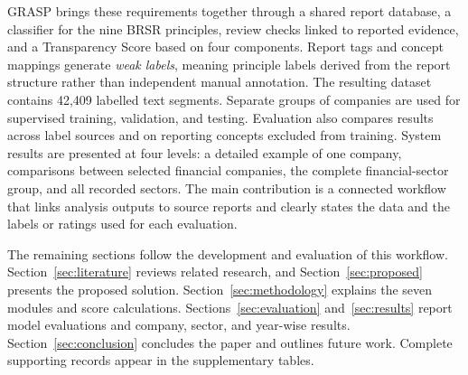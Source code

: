 GRASP brings these requirements together through a shared report database, a classifier for the nine BRSR principles, review checks linked to reported evidence, and a Transparency Score based on four components. Report tags and concept mappings generate \emph{weak labels}, meaning principle labels derived from the report structure rather than independent manual annotation. The resulting dataset contains 42,409 labelled text segments. Separate groups of companies are used for supervised training, validation, and testing. Evaluation also compares results across label sources and on reporting concepts excluded from training. System results are presented at four levels: a detailed example of one company, comparisons between selected financial companies, the complete financial-sector group, and all recorded sectors. The main contribution is a connected workflow that links analysis outputs to source reports and clearly states the data and the labels or ratings used for each evaluation.

The remaining sections follow the development and evaluation of this workflow. Section~\ref{sec:literature} reviews related research, and Section~\ref{sec:proposed} presents the proposed solution. Section~\ref{sec:methodology} explains the seven modules and score calculations. Sections~\ref{sec:evaluation} and~\ref{sec:results} report model evaluations and company, sector, and year-wise results. Section~\ref{sec:conclusion} concludes the paper and outlines future work. Complete supporting records appear in the supplementary tables.
